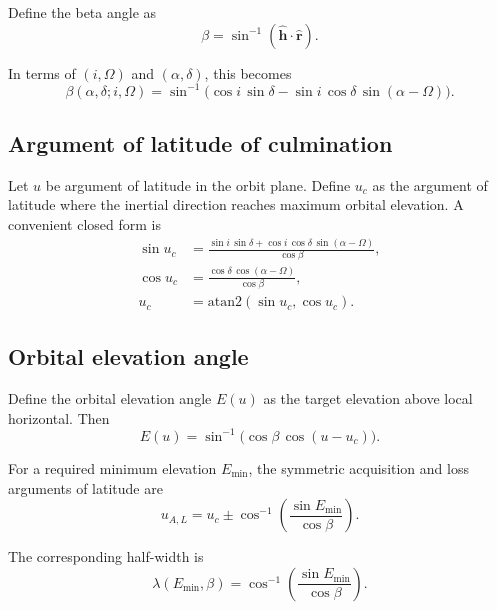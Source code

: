 \documentclass[preprint,12pt]{elsarticle}
\theoremstyle{definition}
\theoremstyle{remark}
\begin{document}
Define the beta angle as
\begin{equation}
\beta = \sin^{-1}\!\left(\hat{\mathbf{h}}\cdot \hat{\mathbf{r}}\right).
\label{eq:beta_dot}
\end{equation}

In terms of $(i,\Omega)$ and $(\alpha,\delta)$, this becomes
\begin{equation}
\beta(\alpha,\delta;i,\Omega)
=
\sin^{-1}\!\Big(
\cos i \,\sin\delta
-
\sin i \,\cos\delta \,\sin(\alpha-\Omega)
\Big).
\label{eq:beta_closed}
\end{equation}

\subsection{Argument of latitude of culmination}

Let $u$ be argument of latitude in the orbit plane.
Define $u_c$ as the argument of latitude where the inertial direction reaches maximum orbital elevation.
A convenient closed form is
\begin{align}
\sin u_c &= \frac{\sin i \,\sin\delta + \cos i \,\cos\delta \,\sin(\alpha-\Omega)}{\cos\beta},
\label{eq:uc_sin}\\
\cos u_c &= \frac{\cos\delta \,\cos(\alpha-\Omega)}{\cos\beta},
\label{eq:uc_cos}\\
u_c &= \mathrm{atan2}\!\left(\sin u_c,\cos u_c\right).
\label{eq:uc_atan2}
\end{align}

\subsection{Orbital elevation angle}

Define the orbital elevation angle $E(u)$ as the target elevation above local horizontal.
Then
\begin{equation}
E(u)=\sin^{-1}\!\Big(\cos\beta\,\cos(u-u_c)\Big).
\label{eq:e_of_u}
\end{equation}

For a required minimum elevation $E_{\min}$, the symmetric acquisition and loss arguments of latitude are
\begin{equation}
u_{A,L}
=
u_c
\pm
\cos^{-1}\!\left(\frac{\sin E_{\min}}{\cos\beta}\right).
\label{eq:ual}
\end{equation}

The corresponding half-width is
\begin{equation}
\lambda(E_{\min},\beta)=
\cos^{-1}\!\left(\frac{\sin E_{\min}}{\cos\beta}\right).
\label{eq:lambda_general}
\end{equation}
\end{document}
